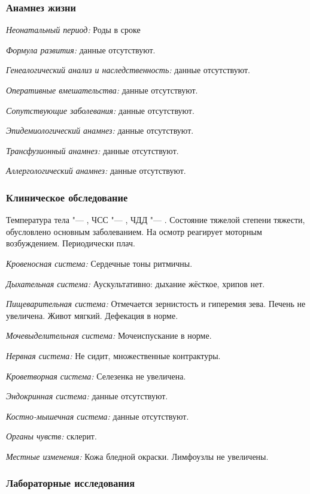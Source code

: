 \documentclass[a4paper,14pt]{extarticle}
\newcommand{\weeks}{нед.}
\newcommand{\oCelsius}{\tcdegree{}C}
\newcommand{\bpm}{уд/мин}
\newcommand{\mpm}{/мин}
\begin{document}
\subsubsection*{Анамнез жизни}

\emph{Неонатальный период:}
Роды в сроке \numprint[\weeks]{26}

\emph{Формула развития:} данные отсутствуют.

\emph{Генеалогический анализ и наследственность:} данные отсутствуют.

\emph{Оперативные вмешательства:} данные отсутствуют.

\emph{Сопутствующие заболевания:} данные отсутствуют.

\emph{Эпидемиологический анамнез:} данные отсутствуют.

\emph{Трансфузионный анамнез:} данные отсутствуют.

\emph{Аллергологический анамнез:} данные отсутствуют.

\subsubsection*{Клиническое обследование}

Температура тела "--- \numprint[\oCelsius]{36.6}, ЧСС "--- \numprint[\bpm]{100}, ЧДД "--- \numprint[\mpm]{24}.
Состояние тяжелой степени тяжести, обусловлено основным заболеванием.
На осмотр реагирует моторным возбуждением.
Периодически плач.

\emph{Кровеносная система:} Сердечные тоны ритмичны.

\emph{Дыхательная система:} Аускультативно: дыхание жёсткое, хрипов нет.

\emph{Пищеварительная система:} Отмечается зернистость и гиперемия зева. Печень не увеличена. Живот мягкий. Дефекация в норме.

\emph{Мочевыделительная система:} Мочеиспускание в норме.

\emph{Нервная система:} Не сидит, множественные контрактуры.

\emph{Кроветворная система:} Селезенка не увеличена.

\emph{Эндокринная система:} данные отсутствуют.

\emph{Костно-мышечная система:} данные отсутствуют.

\emph{Органы чувств:} склерит.

\emph{Местные изменения:} Кожа бледной окраски. Лимфоузлы не увеличены.

\subsubsection*{Лабораторные исследования}
\end{document}
